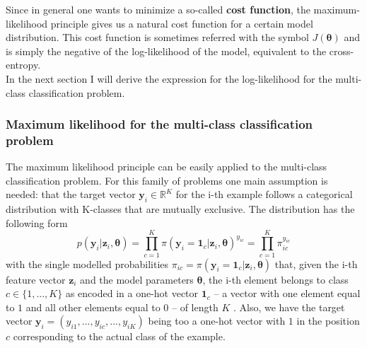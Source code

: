 Since in general one wants to minimize a so-called \textbf{cost function}, the maximum-likelihood principle gives us a natural cost function for a certain model distribution. This cost function is sometimes referred with the symbol $J(\bm{\theta})$ and is simply the negative of the log-likelihood of the model, equivalent to the cross-entropy. \\

In the next section I will derive the expression for the log-likelihood for the multi-class classification problem.
\subsubsection{Maximum likelihood for the multi-class classification problem}
The maximum likelihood principle can be easily applied to the multi-class classification problem. For this family of problems one main assumption is needed: that the target vector $\bm{y}_i \in \mathbb{R}^K$ for the i-th example follows a categorical distribution with K-classes that are mutually exclusive. The distribution has the following form
\begin{equation}
    p(\bm{y}_i| \bm{z}_i, \bm{\theta}) = \prod_{c=1}^{K} \pi(\textbf{y}_i = \bm{1}_c | \bm{z}_i, \bm{\theta})^{y_{ic}} = \prod_{c=1}^K \pi_{ic}^{y_{ic} }
\end{equation}
with the single modelled probabilities $\pi_{ic} = \pi(\textbf{y}_i=\bm{1}_c|\bm{z}_i, \bm{\theta})$ that, given the i-th feature vector $\bm{z}_i$ and the model parameters $\bm{\theta}$, the i-th element belongs to class $c \in \{1,...,K\}$ as encoded in a one-hot vector $\bm{1}_c$ -- a vector with one element equal to $1$ and all other elements equal to $0$ -- of length $K$ \citep{Goodfellow2016,Bishop2006PatternLearning}. Also, we have the target vector $\bm{y}_i = (y_{i1},..., y_{ic},...,y_{iK})$ being too a one-hot vector with $1$ in the position $c$ corresponding to the actual class of the example. 

